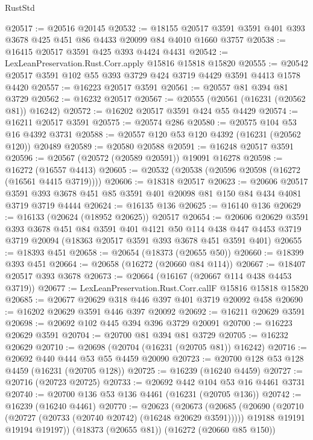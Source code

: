 \begin{lexlean}{RustStd}
\begin{coremodule}
@20517 := @20516 @20145
@20532 := @18155 @20517 @3591 @3591 @401 @393 @3678 @425 @451 @86 @4433 @20099 @84 @4010 @1660 @3757
@20538 := @16415 @20517 @3591 @425 @393 @4424 @4431
@20542 := LexLeanPreservation.Rust.Corr.apply @15816 @15818 @15820
@20555 := @20542 @20517 @3591 @102 @55 @393 @3729 @424 @3719 @4429 @3591 @4413 @1578 @4420
@20557 := @16223 @20517 @3591
@20561 := @20557 @81 @394 @81 @3729
@20562 := @16232 @20517
@20567 := @20555 (@20561 (@16231 (@20562 @81)) @16242)
@20572 := @16202 @20517 @3591 @424 @55 @4429
@20574 := @16211 @20517 @3591
@20575 := @20574 @286
@20580 := @20575 @104 @53 @16 @4392 @3731
@20588 := @20557 @120 @53 @120 @4392 (@16231 (@20562 @120)) @20489
@20589 := @20580 @20588
@20591 := @16248 @20517 @3591
@20596 := @20567 (@20572 (@20589 @20591)) @19091 @16278
@20598 := @16272 (@16557 @4413)
@20605 := @20532 (@20538 (@20596 @20598 (@16272 (@16561 @4415 @3719))))
@20606 := @18318 @20517
@20623 := @20606
    @20517
    @3591
    @393
    @3678
    @451
    @85
    @3591
    @401
    @20098
    @81
    @150
    @84
    @434
    @4081
    @3719
    @3719
    @4444
@20624 := @16135 @136
@20625 := @16140 @136
@20629 := @16133 (@20624 (@18952 @20625)) @20517
@20654 := @20606
    @20629
    @3591
    @393
    @3678
    @451
    @84
    @3591
    @401
    @4121
    @50
    @114
    @438
    @447
    @4453
    @3719
    @3719
    @20094
    (@18363 @20517 @3591 @393 @3678 @451 @3591 @401)
@20655 := @18393 @451
@20658 := @20654 (@18373 (@20655 @50))
@20660 := @18399 @393 @451
@20664 := @20658 (@16272 (@20660 @84 @114))
@20667 := @18407 @20517 @393 @3678
@20673 := @20664 (@16167 (@20667 @114 @438 @4453 @3719))
@20677 := LexLeanPreservation.Rust.Corr.callF @15816 @15818 @15820
@20685 := @20677 @20629 @318 @446 @397 @401 @3719 @20092 @458
@20690 := @16202 @20629 @3591 @446 @397 @20092
@20692 := @16211 @20629 @3591
@20698 := @20692 @102 @445 @394 @396 @3729 @20091
@20700 := @16223 @20629 @3591
@20704 := @20700 @81 @394 @81 @3729
@20705 := @16232 @20629
@20710 := @20698 (@20704 (@16231 (@20705 @81)) @16242)
@20716 := @20692 @440 @444 @53 @55 @4459 @20090
@20723 := @20700 @128 @53 @128 @4459 (@16231 (@20705 @128))
@20725 := @16239 (@16240 @4459)
@20727 := @20716 (@20723 @20725)
@20733 := @20692 @442 @104 @53 @16 @4461 @3731
@20740 := @20700 @136 @53 @136 @4461 (@16231 (@20705 @136))
@20742 := @16239 (@16240 @4461)
@20770 := @20623
    (@20673
      (@20685
        (@20690 (@20710 (@20727 (@20733 (@20740 @20742) (@16248 @20629 @3591)))))
        @19188
        @19191
        @19194
        @19197))
    (@18373 (@20655 @81))
    (@16272 (@20660 @85 @150))

\end{coremodule}
\end{lexlean}
